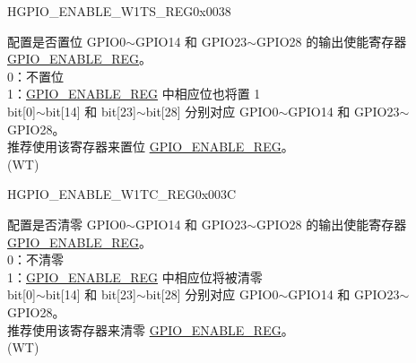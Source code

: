 \begin{register}{H}{GPIO\_ENABLE\_W1TS\_REG}{0x0038}\label{regdesc:GPIOENABLEW1TSREG}
%
\regnewline%
\begin{regdesc}\begin{reglist}
\label{fielddesc:GPIOENABLEW1TS}\item [GPIO\_ENABLE\_W1TS] 配置是否置位 GPIO0$\sim$GPIO14 和 GPIO23$\sim$GPIO28 的输出使能寄存器 \hyperref[regdesc:GPIOENABLEREG]{GPIO\_ENABLE\_REG}。\\
0：不置位\\
1：\hyperref[regdesc:GPIOENABLEREG]{GPIO\_ENABLE\_REG} 中相应位也将置 1\\
bit[0]$\sim$bit[14] 和 bit[23]$\sim$bit[28] 分别对应 GPIO0$\sim$GPIO14 和 GPIO23$\sim$GPIO28。\\
推荐使用该寄存器来置位 \hyperref[regdesc:GPIOENABLEREG]{GPIO\_ENABLE\_REG}。\\ (WT)
\end{reglist}\end{regdesc}
\end{register}


\begin{register}{H}{GPIO\_ENABLE\_W1TC\_REG}{0x003C}\label{regdesc:GPIOENABLEW1TCREG}
%
\regnewline%
\begin{regdesc}\begin{reglist}
\label{fielddesc:GPIOENABLEW1TC}\item [GPIO\_ENABLE\_W1TC] 配置是否清零 GPIO0$\sim$GPIO14 和 GPIO23$\sim$GPIO28 的输出使能寄存器 \hyperref[regdesc:GPIOENABLEREG]{GPIO\_ENABLE\_REG}。\\
0：不清零\\
1：\hyperref[regdesc:GPIOENABLEREG]{GPIO\_ENABLE\_REG} 中相应位将被清零\\
bit[0]$\sim$bit[14] 和 bit[23]$\sim$bit[28] 分别对应 GPIO0$\sim$GPIO14 和 GPIO23$\sim$GPIO28。\\
推荐使用该寄存器来清零 \hyperref[regdesc:GPIOENABLEREG]{GPIO\_ENABLE\_REG}。\\ (WT)
\end{reglist}\end{regdesc}
\end{register}


